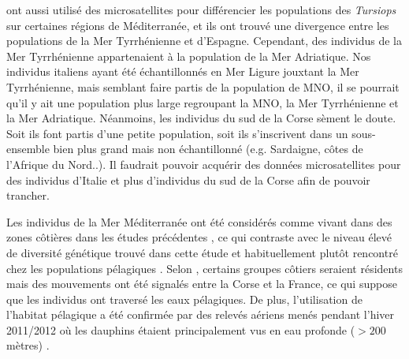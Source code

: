 \documentclass[a4paper,12pt,twoside]{article}\usepackage[]{graphicx}\usepackage[]{color}
\begin{document}
\begin {bibunit} [newbst]
{\citet{natoli2005habitat} ont aussi utilisé des microsatellites pour différencier les populations des \emph{Tursiops} sur certaines régions de Méditerranée, et ils ont trouvé une divergence entre les populations de la Mer Tyrrhénienne et d'Espagne. Cependant, des individus de la Mer Tyrrhénienne appartenaient à la population de la Mer Adriatique. Nos individus italiens ayant été échantillonnés en Mer Ligure jouxtant la Mer Tyrrhénienne, mais semblant faire partis de la population de MNO, il se pourrait qu'il y ait une population plus large regroupant la MNO, la Mer Tyrrhénienne et la Mer Adriatique. Néanmoins, les individus du sud de la Corse sèment le doute. Soit ils font partis d'une petite population, soit ils s'inscrivent dans un sous-ensemble bien plus grand mais non échantillonné (e.g. Sardaigne, côtes de l'Afrique du Nord..). Il faudrait pouvoir acquérir des données microsatellites pour des individus d'Italie et plus d'individus du sud de la Corse afin de pouvoir trancher.

Les individus de la Mer Méditerranée ont été considérés comme vivant dans des zones côtières dans les études précédentes \citep{natoli2004population, natoli2005habitat}, ce qui contraste avec le niveau élevé de diversité génétique trouvé dans cette étude et habituellement plutôt rencontré chez les populations pélagiques \citep{natoli2004population}. Selon \citet{gnone2011distribution}, certains groupes côtiers seraient résidents mais des mouvements ont été signalés entre la Corse et la France, ce qui suppose que les individus ont traversé les eaux pélagiques. De plus, l'utilisation de l'habitat pélagique a été confirmée par des relevés aériens menés pendant l'hiver 2011/2012 où les dauphins étaient principalement vus en eau profonde ($> 200$ mètres) \citep{louis2014}.

}
\end{bibunit}
\end{document}
